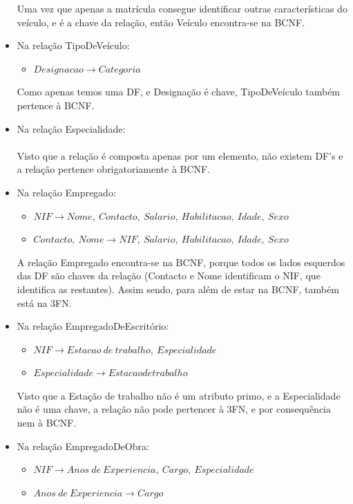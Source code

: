 \documentclass{report}
\begin{document}
\begin{itemize}
			Uma vez que apenas a matrícula consegue identificar outras características do 
			veículo, e é a chave da relação, então Veículo encontra-se na BCNF.
			
			\item Na relação TipoDeVeículo:
			\begin{itemize}
				\item $Designacao \rightarrow Categoria$
			\end{itemize}

			Como apenas temos uma DF, e Designação é chave, TipoDeVeículo também pertence à 
			BCNF.
			
			\item Na relação Especialidade:
			\\ \\
			Visto que a relação é composta apenas por um elemento, não existem DF’s e a
			relação pertence obrigatoriamente à BCNF.
			
			\item Na relação Empregado:
			\begin{itemize}
				\item $NIF \rightarrow Nome,\ Contacto,\ Salario,\ Habilitacao,\ Idade,\ Sexo$
				\item $Contacto,\ Nome \rightarrow NIF,\ Salario,\ Habilitacao,\ Idade,\ Sexo$
			\end{itemize}
			
			A relação Empregado encontra-se na BCNF, porque todos os lados esquerdos das DF 
			são chaves da relação (Contacto e Nome identificam o NIF, que identifica as 
			restantes). Assim sendo, para além de estar na BCNF, também está na 3FN.
			
			\item Na relação EmpregadoDeEscritório:
			\begin{itemize}
				\item $NIF \rightarrow Estacao\ de\ trabalho,\ Especialidade$
				\item $Especialidade \rightarrow Estacao de trabalho$
			\end{itemize}
			
			Visto que a Estação de trabalho não é um atributo primo, e a Especialidade não é 
			uma chave, a relação não pode pertencer à 3FN, e por consequência nem à BCNF.
			
			\item Na relação EmpregadoDeObra:
			\begin{itemize}
				\item $NIF \rightarrow Anos\ de\ Experiencia,\ Cargo,\ Especialidade$
				\item $Anos\ de\ Experiencia \rightarrow Cargo$
			\end{itemize}
			

\end{itemize}
\end{document}
